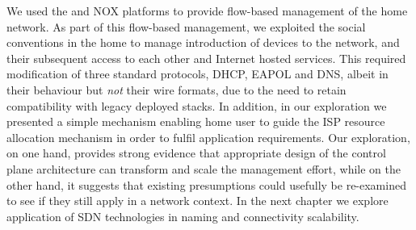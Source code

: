 We used the \ovs and NOX platforms to provide flow-based management of the home
network.  As part of this flow-based management, we exploited the social
conventions in the home to manage introduction of devices  to the network, and
their subsequent access to each other and Internet hosted services.  This
required modification of three standard protocols, DHCP, EAPOL and DNS, albeit
in their behaviour but \emph{not} their wire formats, due to the need to retain
compatibility with legacy deployed stacks. In addition, in our exploration we
presented a simple mechanism enabling home user to guide the ISP resource
allocation mechanism in order to fulfil application requirements.  Our
exploration, on one hand, provides strong evidence that appropriate design of
the control plane architecture can transform and scale the management effort,
while on the other hand, it suggests that existing presumptions could usefully
be re-examined to see if they still apply in a network context.  In the next
chapter we explore application of SDN technologies in naming and connectivity
scalability. 

